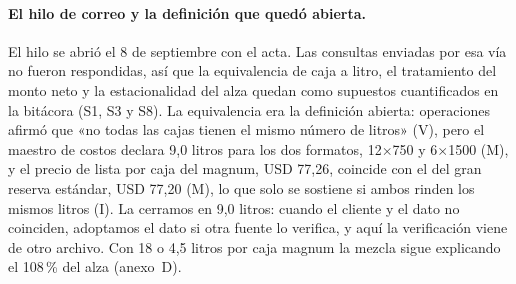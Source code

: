 \paragraph{El hilo de correo y la definición que quedó abierta.} El hilo se abrió el 8 de septiembre con el acta. Las consultas enviadas por esa vía no fueron respondidas, así que la equivalencia de caja a litro, el tratamiento del monto neto y la estacionalidad del alza quedan como supuestos cuantificados en la bitácora (S1, S3 y S8). La equivalencia era la definición abierta: operaciones afirmó que «no todas las cajas tienen el mismo número de litros» (V), pero el maestro de costos declara 9,0 litros para los dos formatos, 12$\times$750 y 6$\times$1500 (M), y el precio de lista por caja del magnum, USD 77,26, coincide con el del gran reserva estándar, USD 77,20 (M), lo que solo se sostiene si ambos rinden los mismos litros (I). La cerramos en 9,0 litros: cuando el cliente y el dato no coinciden, adoptamos el dato si otra fuente lo verifica, y aquí la verificación viene de otro archivo. Con 18 o 4,5 litros por caja magnum la mezcla sigue explicando el 108\,\% del alza (anexo~D).
